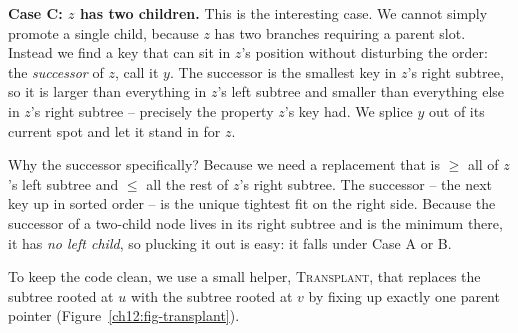 \textbf{Case C: $z$ has two children.} This is the interesting case. We cannot simply promote a single
child, because $z$ has two branches requiring a parent slot. Instead we find a key that can sit in
$z$'s position without disturbing the order: the \emph{successor} of $z$, call it $y$. The
successor is the smallest key in $z$'s right subtree, so it is larger than everything in
$z$'s left subtree and smaller than everything else in $z$'s right subtree -- precisely the
property $z$'s key had. We splice $y$ out of its current spot and let it stand in for $z$.

\begin{intuitionbox}
Why the successor specifically? Because we need a replacement that is $\ge$ all of $z$'s left
subtree and $\le$ all the rest of $z$'s right subtree. The successor -- the next key up in
sorted order -- is the unique tightest fit on the right side. Because the successor of
a two-child node lives in its right subtree and is the minimum there, it has \emph{no left child},
so plucking it out is easy: it falls under Case A or B.
\end{intuitionbox}

To keep the code clean, we use a small helper, \textsc{Transplant}, that replaces the subtree
rooted at $u$ with the subtree rooted at $v$ by fixing up exactly one parent pointer (Figure~\ref{ch12:fig-transplant}).

\begin{algorithm}[H]
\caption{\textsc{Transplant}($T$, $u$, $v$)}
\end{algorithm}

